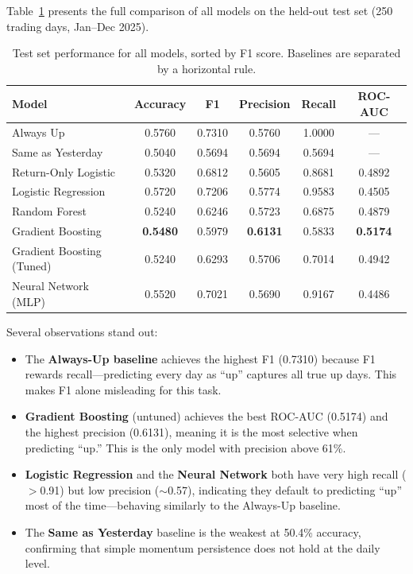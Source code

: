 \documentclass[11pt]{article}
\begin{document}
Table~\ref{tab:results} presents the full comparison of all models on the held-out test set (250 trading days, Jan--Dec 2025).

\begin{table}[H]
\centering
\caption{Test set performance for all models, sorted by F1 score. Baselines are separated by a horizontal rule.}
\label{tab:results}
\begin{tabular}{lccccc}
\toprule
\textbf{Model} & \textbf{Accuracy} & \textbf{F1} & \textbf{Precision} & \textbf{Recall} & \textbf{ROC-AUC} \\
\midrule
Always Up            & 0.5760 & 0.7310 & 0.5760 & 1.0000 & ---    \\
Same as Yesterday    & 0.5040 & 0.5694 & 0.5694 & 0.5694 & ---    \\
Return-Only Logistic & 0.5320 & 0.6812 & 0.5605 & 0.8681 & 0.4892 \\
\midrule
Logistic Regression       & 0.5720 & 0.7206 & 0.5774 & 0.9583 & 0.4505 \\
Random Forest             & 0.5240 & 0.6246 & 0.5723 & 0.6875 & 0.4879 \\
Gradient Boosting         & \textbf{0.5480} & 0.5979 & \textbf{0.6131} & 0.5833 & \textbf{0.5174} \\
Gradient Boosting (Tuned) & 0.5240 & 0.6293 & 0.5706 & 0.7014 & 0.4942 \\
Neural Network (MLP)      & 0.5520 & 0.7021 & 0.5690 & 0.9167 & 0.4486 \\
\bottomrule
\end{tabular}
\end{table}

Several observations stand out:

\begin{itemize}
    \item The \textbf{Always-Up baseline} achieves the highest F1 (0.7310) because F1 rewards recall---predicting every day as ``up'' captures all true up days. This makes F1 alone misleading for this task.

    \item \textbf{Gradient Boosting} (untuned) achieves the best ROC-AUC (0.5174) and the highest precision (0.6131), meaning it is the most selective when predicting ``up.'' This is the only model with precision above 61\%.

    \item \textbf{Logistic Regression} and the \textbf{Neural Network} both have very high recall ($>$0.91) but low precision ($\sim$0.57), indicating they default to predicting ``up'' most of the time---behaving similarly to the Always-Up baseline.

    \item The \textbf{Same as Yesterday} baseline is the weakest at 50.4\% accuracy, confirming that simple momentum persistence does not hold at the daily level.
\end{itemize}
\end{document}
